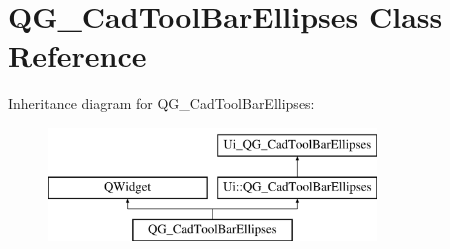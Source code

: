 \hypertarget{classQG__CadToolBarEllipses}{\section{Q\-G\-\_\-\-Cad\-Tool\-Bar\-Ellipses Class Reference}
\label{classQG__CadToolBarEllipses}
}
Inheritance diagram for Q\-G\-\_\-\-Cad\-Tool\-Bar\-Ellipses\-:\begin{figure}[H]
\begin{center}
\leavevmode
\includegraphics[height=3.000000cm]{classQG__CadToolBarEllipses}
\end{center}
\end{figure}
